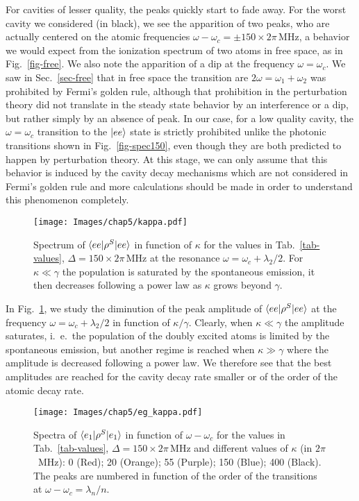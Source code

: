For cavities of lesser quality, the peaks quickly start to fade away. For the worst cavity we considered (in black), we see the apparition of two peaks, who are actually centered on the atomic frequencies $\omega-\omega_c = \pm 150 \times 2\pi\,\mbox{MHz}$, a behavior we would expect from the ionization spectrum of two atoms in free space, as in Fig.~\ref{fig-free}. We also note the apparition of a dip at the frequency $\omega=\omega_c$. We saw in Sec.~\ref{sec-free} that in free space the transition are $2\omega=\omega_1+\omega_2$ was prohibited by Fermi's golden rule, although that prohibition in the perturbation theory did not translate in the steady state behavior by an interference or a dip, but rather simply by an absence of peak. In our case, for a low quality cavity, the $\omega=\omega_c$ transition to the $| ee \rangle$ state is strictly prohibited unlike the photonic transitions shown in Fig.~\ref{fig-spec150}, even though they are both predicted to happen by perturbation theory. At this stage, we can only assume that this behavior is induced by the cavity decay mechanisms which are not considered in Fermi's golden rule and more calculations should be made in order to understand this phenomenon completely.

\begin{figure}
    \center
    \texttt{[image: Images/chap5/kappa.pdf]}
    \caption[$\prodsc{ee}{\rho^S}{ee}$ in function of $\kappa$]{ Spectrum of $\prodsc{ee}{\rho^S}{ee}$ in function of $\kappa$ for the values in Tab.~\ref{tab-values}, $\Delta=150 \times 2\pi\,\mbox{MHz}$ at the resonance $\omega=\omega_c+ \lambda_2/2$. For $\kappa\ll \gamma$ the population is saturated by the spontaneous emission, it then decreases following a power law as $\kappa$ grows beyond $\gamma$.}
    \label{fig-kappa}
\end{figure}

In Fig.~\ref{fig-kappa}, we study the diminution of the peak amplitude of $\prodsc{ee}{\rho^S}{ee}$ at the frequency $\omega=\omega_c + \lambda_2/2$ in function of $\kappa/\gamma$. Clearly, when $\kappa \ll \gamma$ the amplitude saturates, i.~e.~the population of the doubly excited atoms is limited by the spontaneous emission, but another regime is reached when $\kappa \gg \gamma$ where the amplitude is decreased following a power law. We therefore see that the best amplitudes are reached for the cavity decay rate smaller or of the order of the atomic decay rate.


\begin{figure}
    \center
    \texttt{[image: Images/chap5/eg\_kappa.pdf]}
    \caption[$\prodsc{e_1}{\rho^S}{e_1}$ in function of $\omega-\omega_c$]{ Spectra of $\prodsc{e_1}{\rho^S}{e_1}$ in function of $\omega-\omega_c$ for the values in Tab.~\ref{tab-values}, $\Delta=150 \times 2\pi\,\mbox{MHz}$ and different values of $\kappa$ (in $2\pi$~MHz): 0 (Red); 20 (Orange); 55 (Purple); 150 (Blue); 400 (Black). The peaks are numbered in function of the order of the transitions at $\omega-\omega_c=\lambda_n/n$. }
    \label{fig-eg_kappa}
\end{figure}


